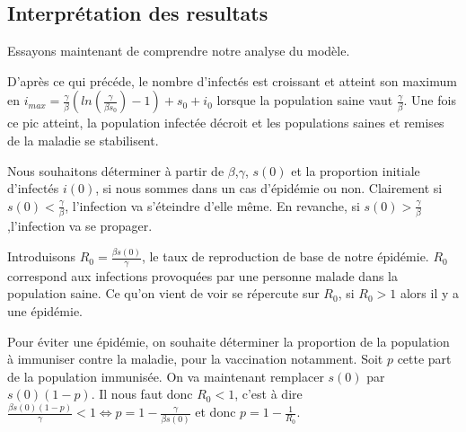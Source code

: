 \documentclass[a4paper]{article}
\theoremstyle{plain}
\theoremstyle{definition}
\theoremstyle{remark}
\begin{document}
\subsection{Interprétation des resultats}

Essayons maintenant de comprendre notre analyse du modèle.

D'après ce qui précéde, le nombre d'infectés est croissant et atteint son maximum en $  i_{max}=\frac{\gamma}{\beta}(ln(\frac{\gamma}{\beta s_0})-1)+s_0+i_0$ lorsque la population saine vaut $\frac{\gamma}{\beta}$. Une fois ce pic atteint, la population infectée décroit et les populations saines et remises de la maladie se stabilisent.

Nous souhaitons déterminer à partir de $\beta$,$\gamma$, $s(0)$ et la proportion initiale d'infectés $i(0)$, si nous sommes dans un cas d'épidémie ou non. Clairement si $s(0) < \frac{\gamma}{\beta}$, l'infection va s'éteindre d'elle même.
En revanche, si $s(0) > \frac{\gamma}{\beta}$,l'infection va se propager. 

Introduisons $R_0 = \frac{\beta s(0)}{\gamma}$, le taux de reproduction de base de notre épidémie. $R_0$ correspond aux infections provoquées par une personne malade dans la population saine. Ce qu'on vient de voir se répercute sur $R_0$, si $R_0 > 1$ alors il y a une épidémie. 

Pour éviter une épidémie, on souhaite déterminer la proportion de la population à immuniser contre la maladie, pour la vaccination notamment. Soit $p$ cette part de la population immunisée. On va maintenant remplacer $s(0)$ par $s(0)(1-p)$. Il nous faut donc $R_0 < 1$, c'est à dire $\frac{\beta s(0)(1-p)}{\gamma} < 1 \Leftrightarrow p = 1 - \frac{\gamma}{\beta s(0)} $ et donc $ p = 1 - \frac{1}{R_0}$.
\end{document}
